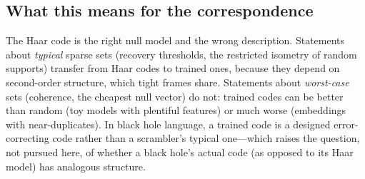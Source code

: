 \subsection{What this means for the correspondence}\label{sec:part1-meaning}
The Haar code is the right null model and the wrong description. Statements about \emph{typical} sparse sets
(recovery thresholds, the restricted isometry of random supports) transfer from Haar codes to trained ones,
because they depend on second-order structure, which tight frames share. Statements about \emph{worst-case} sets
(coherence, the cheapest null vector) do not: trained codes can be better than random (toy models with plentiful
features) or much worse (embeddings with near-duplicates). In black hole language, a trained code is a designed
error-correcting code rather than a scrambler's typical one---which raises the question, not pursued here, of
whether a black hole's actual code (as opposed to its Haar model) has analogous structure.
